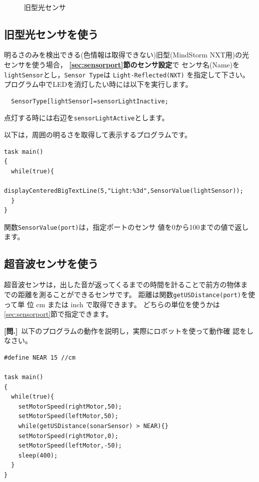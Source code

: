 \documentclass[11pt]{jsarticle}
\makeatletter
\newcounter{qnum}[section]
\def\theqnum{問\thesection.\the\c@qnum}
\def\question{\refstepcounter{qnum}%
  \vspace{3mm}\noindent\textbf{[\theqnum]}~}
\makeatother
\begin{document}
\begin{figure}%
\begin{center}
  \\
  旧型光センサ
\end{center}
\end{figure}
\subsection{旧型光センサを使う}

明るさのみを検出できる(色情報は取得できない)旧型(MindStorm NXT用)の光
センサを使う場合，
\textbf{\ref{sec:sensorport}節のセンサ設定}で
センサ名(Name)を\verb|lightSensor|とし，\verb|Sensor Type|は
\verb|Light-Reflected(NXT)|
を指定して下さい。
プログラム中でLEDを消灯したい時には以下を実行します。
\begin{lstlisting}
  SensorType[lightSensor]=sensorLightInactive;
\end{lstlisting}
点灯する時には右辺を\verb|sensorLightActive|とします。

以下は，周囲の明るさを取得して表示するプログラムです。
\begin{lstlisting}
task main()
{
  while(true){
    displayCenteredBigTextLine(5,"Light:%3d",SensorValue(lightSensor));
  }
}
\end{lstlisting}

関数\verb|SensorValue(port)|は，指定ポートのセンサ
値を0から100までの値で返します。


\subsection{超音波センサを使う}

超音波センサは，出した音が返ってくるまでの時間を計ることで前方の物体ま
での距離を測ることができるセンサです。
距離は関数\verb|getUSDistance(port)|を使って単
位 cm または inch で取得できます。
どちらの単位を使うかは\ref{sec:sensorport}節で指定できます。

\question 以下のプログラムの動作を説明し，実際にロボットを使って動作確
認をしなさい。


\begin{lstlisting}
#define NEAR 15 //cm

task main()
{
  while(true){
    setMotorSpeed(rightMotor,50);
    setMotorSpeed(leftMotor,50);
    while(getUSDistance(sonarSensor) > NEAR){}
    setMotorSpeed(rightMotor,0);
    setMotorSpeed(leftMotor,-50);
    sleep(400);
  }
}
\end{lstlisting}
\end{document}

